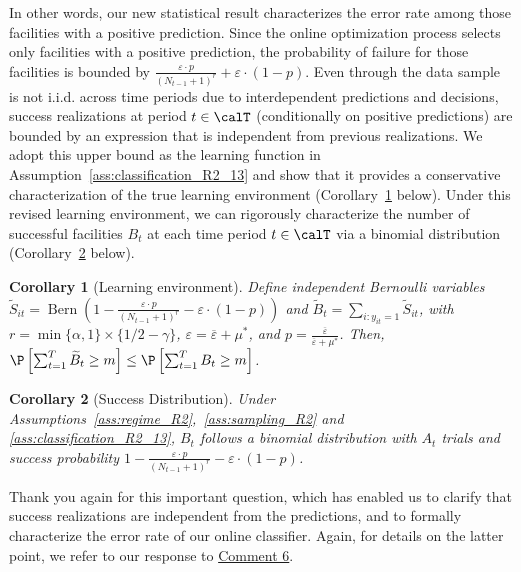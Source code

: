 \documentclass[11pt]{article}
\DeclareMathOperator{\Bern}{Bern}
\newtheorem{corollary}{Corollary}[]
\begin{document}
In other words, our new statistical result characterizes the error rate among those facilities with a positive prediction. Since the online optimization process selects only facilities with a positive prediction, the probability of failure for those facilities is bounded by $\frac{\varepsilon\cdot p}{\left(N_{t-1} + 1\right)^r}+\varepsilon\cdot(1-p)$. Even through the data sample is not i.i.d. across time periods due to interdependent predictions and decisions, success realizations at period $t\in\calT$ (conditionally on positive predictions) are bounded by an expression that is independent from previous realizations. We adopt this upper bound as the learning function in Assumption~\ref{ass:classification_R2_13} and show that it provides a conservative characterization of the true learning environment (Corollary~\ref{cor:learning_R2_13} below). Under this revised learning environment, we can rigorously characterize the number of successful facilities $B_t$ at each time period $t\in\calT$ via a binomial distribution (Corollary~\ref{cor:success_R2_13} below).
\setcounter{corollary}{0}
\begin{corollary}[Learning environment] \label{cor:learning_R2_13}
    Define independent Bernoulli variables\\$\widetilde{S}_{it}=\Bern\left(1-\frac{\varepsilon\cdot p}{\left(N_{t-1} + 1\right)^r}-\varepsilon\cdot(1-p)\right)$ and $\widetilde{B}_t = \sum_{i:y_{it}=1} \widetilde{S}_{it}$, with $r=\min\{\alpha,1\} \times \{1/2-\gamma\}$, $\varepsilon = \overline\varepsilon + \mu^*$, and $p = \frac{\overline\varepsilon}{\overline\varepsilon+\mu^*}$. Then, $\P\left[\sum_{t=1}^T\widetilde{B}_t\geq m\right] \leq \P\left[\sum_{t=1}^TB_t\geq m\right]$.
\end{corollary}

\begin{corollary}[Success Distribution]\label{cor:success_R2_13}
    Under Assumptions~\ref{ass:regime_R2},~\ref{ass:sampling_R2} and \ref{ass:classification_R2_13}, $B_t$ follows a binomial distribution with $A_t$ trials and success probability $1- \frac{\varepsilon\cdot p}{\left(N_{t-1} + 1\right)^r}-\varepsilon\cdot(1-p)$. 
\end{corollary}

Thank you again for this important question, which has enabled us to clarify that success realizations are independent from the predictions, and to formally characterize the error rate of our online classifier. Again, for details on the latter point, we refer to our response to \hyperref[R2:6]{\color{blue}Comment 6}.
\end{document}
